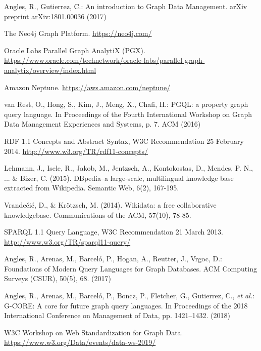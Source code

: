 \documentclass[runningheads]{llncs}
\begin{document}
%
%
%

% 
%
\begin{thebibliography}{8}

Angles, R., Gutierrez, C.: An introduction to Graph Data Management. arXiv preprint arXiv:1801.00036 (2017)

The Neo4j Graph Platform. \url{https://neo4j.com/}

Oracle Labs Parallel Graph AnalytiX (PGX). \url{https://www.oracle.com/technetwork/oracle-labs/parallel-graph-analytix/overview/index.html}

Amazon Neptune. \url{https://aws.amazon.com/neptune/}

van Rest, O., Hong, S., Kim, J., Meng, X., Chafi, H.: PGQL: a property graph query language. In Proceedings of the Fourth International Workshop on Graph Data Management Experiences and Systems, p. 7. ACM (2016)

RDF 1.1 Concepts and Abstract Syntax, W3C Recommendation 25 February 2014. \url{http://www.w3.org/TR/rdf11-concepts/}

Lehmann, J., Isele, R., Jakob, M., Jentzsch, A., Kontokostas, D., Mendes, P. N., ... & Bizer, C. (2015). DBpedia–a large-scale, multilingual knowledge base extracted from Wikipedia. Semantic Web, 6(2), 167-195.

Vrandečić, D., & Krötzsch, M. (2014). Wikidata: a free collaborative knowledgebase. Communications of the ACM, 57(10), 78-85.

SPARQL 1.1 Query Language, W3C Recommendation 21 March 2013. \url{http://www.w3.org/TR/sparql11-query/}

Angles, R., Arenas, M., Barceló, P., Hogan, A., Reutter, J., Vrgoc, D.: Foundations of Modern Query Languages for Graph Databases. ACM Computing Surveys (CSUR), 50(5), 68. (2017)

Angles, R., Arenas, M., Barceló, P., Boncz, P., Fletcher, G., Gutierrez, C., {\itshape et al.}: G-CORE: A core for future graph query languages. In Proceedings of the 2018 International Conference on Management of Data, pp. 1421--1432. (2018)

W3C Workshop on Web Standardization for Graph Data. \url{https://www.w3.org/Data/events/data-ws-2019/}


\end{thebibliography}
\end{document}
